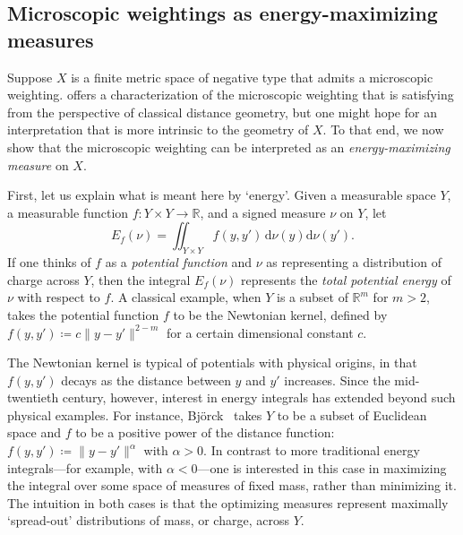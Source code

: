 \documentclass[a4paper, oneside, reqno]{amsart}
\theoremstyle{definition}
\theoremstyle{remark}
\numberwithin{equation}{section}
\newcommand{\R}{\mathbb{R}}
\newcommand{\dd}{\mathrm{d}} %
\begin{document}

\subsection{Microscopic weightings as energy-maximizing measures}
\label{subsec:maximum-energy}

Suppose \(X\) is a finite metric space of negative type that admits a microscopic weighting.  offers a characterization of the microscopic weighting that is satisfying from the perspective of classical distance geometry, but one might hope for an interpretation that is more intrinsic to the geometry of \(X\). To that end, we now show that the microscopic weighting can be interpreted as an \emph{energy-maximizing measure} on \(X\).

First, let us explain what is meant here by `energy'. Given a measurable space \(Y\), a measurable function \(f \colon Y \times Y \to \R\), and a signed measure \(\nu\) on \(Y\), let
\[E_f(\nu) = \iint_{Y \times Y} f(y, y')\,\dd\nu(y)\dd\nu(y').\]
If one thinks of \(f\) as a \emph{potential function} and \(\nu\) as representing a distribution of charge across \(Y\), then the integral \(E_f(\nu)\) represents the \emph{total potential energy} of \(\nu\) with respect to \(f\). A classical example, when \(Y\) is a subset of \(\R^m\) for \(m > 2\), takes the potential function \(f\) to be the {Newtonian kernel}, defined by \(f(y,y') \coloneq c \|y - y'\|^{2-m}\) for a certain dimensional constant \(c\).

The Newtonian kernel is typical of potentials with physical origins, in that \(f(y,y')\) decays as the distance between \(y\) and \(y'\) increases. Since the mid-twentieth century, however, interest in energy integrals has extended beyond such physical examples. For instance, Bj\"orck~\cite{Bjoerck:Distributions-of-positive-mass} takes \(Y\) to be a subset of Euclidean space and \(f\) to be a positive power of the distance function: \(f(y, y') \coloneq \|y - y'\|^\alpha\) with \(\alpha > 0\). In contrast to more traditional energy integrals---for example, with \(\alpha <0\)---one is interested in this case in maximizing the integral over some space of measures of fixed mass, rather than minimizing it. The intuition in both cases is that the optimizing measures represent maximally `spread-out' distributions of mass, or charge, across \(Y\). 
\end{document}
